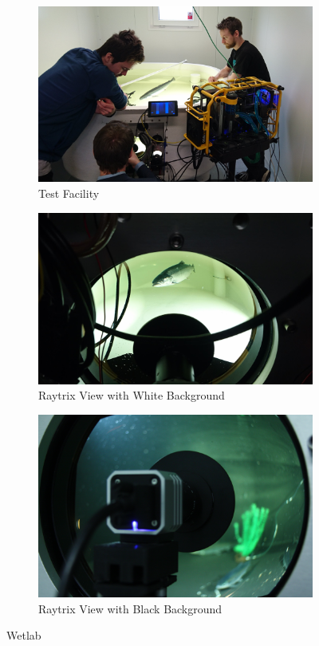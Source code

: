 \begin{figure}[ht]
    \centering
    \begin{subfigure}{1\textwidth}
        \centering
        \includegraphics[width=.6\linewidth]{images/hardware/wetlab_overview}
        \caption{Test Facility} 
    \end{subfigure}\hspace*{\fill}
    
    \medskip
    \begin{subfigure}{1\textwidth}
        \centering
        \includegraphics[width=.6\linewidth]{images/hardware/wetlab_fish_dome}
        \caption{Raytrix View with White Background} 
    \end{subfigure}\hspace*{\fill}
    
    \medskip
    \begin{subfigure}{1\textwidth}
        \centering
        \includegraphics[width=.6\linewidth]{images/hardware/wetlab_raytrix}
        \caption{Raytrix View with Black Background} 
    \end{subfigure}\hspace*{\fill}
    \caption{Wetlab \cite{website:sealab}}
    \label{fig:wetlab}
\end{figure}









